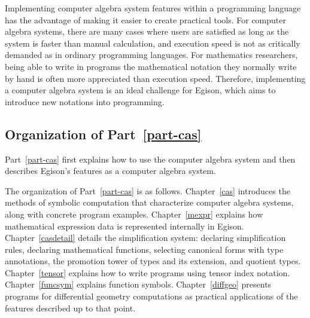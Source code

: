 Implementing computer algebra system features within a programming language has the advantage of making it easier to create practical tools.
For computer algebra systems, there are many cases where users are satisfied as long as the system is faster than manual calculation, and execution speed is not as critically demanded as in ordinary programming languages.
For mathematics researchers, being able to write in programs the mathematical notation they normally write by hand is often more appreciated than execution speed.
Therefore, implementing a computer algebra system is an ideal challenge for Egison, which aims to introduce new notations into programming.


\subsection{Organization of Part~\ref{part-cas}}

Part~\ref{part-cas} first explains how to use the computer algebra system and then describes Egison's features as a computer algebra system.

The organization of Part~\ref{part-cas} is as follows.
Chapter~\ref{cas} introduces the methods of symbolic computation that characterize computer algebra systems, along with concrete program examples.
Chapter~\ref{mexpr} explains how mathematical expression data is represented internally in Egison.
Chapter~\ref{casdetail} details the simplification system: declaring simplification rules, declaring mathematical functions, selecting canonical forms with type annotations, the promotion tower of types and its extension, and quotient types.
Chapter~\ref{tensor} explains how to write programs using tensor index notation.
Chapter~\ref{funcsym} explains function symbols.
Chapter~\ref{diffgeo} presents programs for differential geometry computations as practical applications of the features described up to that point.
